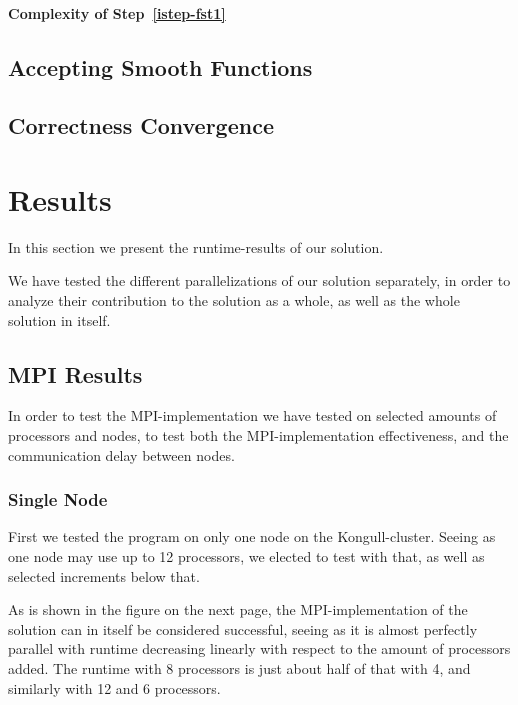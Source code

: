 \documentclass[fontsize=11pt,paper=a4,titlepage]{article}
\begin{document}
\paragraph{Complexity of Step~\ref{istep-fst1}}

\subsection{Accepting Smooth Functions}

\subsection{Correctness Convergence}


\section{Results}

In this section we present the runtime-results of our solution.

We have tested the different parallelizations of our solution separately, in
order to analyze their contribution to the solution as a whole, as well as the
whole solution in itself.

\subsection{MPI Results}

In order to test the MPI-implementation we have tested on selected amounts of
processors and nodes, to test both the MPI-implementation effectiveness, and the
communication delay between nodes.

\subsubsection{Single Node}

First we tested the program on only one node on the Kongull-cluster. Seeing as
one node may use up to 12 processors, we elected to test with that, as well as
selected increments below that.

As is shown in the figure on the next page, the MPI-implementation of the
solution can in itself be considered successful, seeing as it is almost
perfectly parallel with runtime decreasing linearly with respect to the amount
of processors added. The runtime with 8 processors is just about half of that
with 4, and similarly with 12 and 6 processors.
\end{document}
